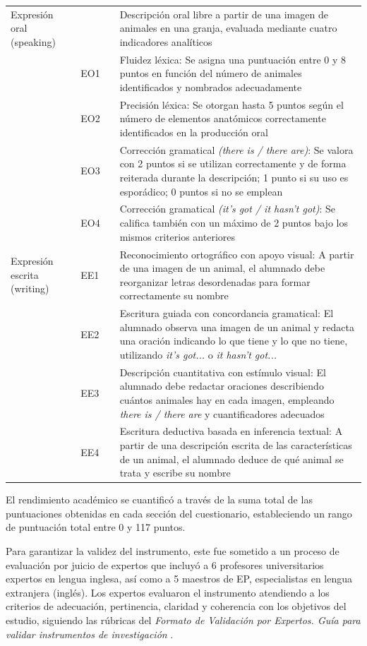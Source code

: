 \documentclass[spanish]{textolivre}
\begin{document}
\begin{longtable}{>{\raggedright\arraybackslash}p{1.9cm} >{\raggedright\arraybackslash}p{1.2cm} >{\raggedright\arraybackslash}p{1cm} p{9cm}}
\addlinespace

Expresión oral (speaking) &  &  & Descripción oral libre a partir de una imagen de animales en una granja, evaluada mediante cuatro indicadores analíticos \\
& EO1 & 8 & Fluidez léxica: Se asigna una puntuación entre 0 y 8 puntos en función del número de animales identificados y nombrados adecuadamente \\
& EO2 & 5 & Precisión léxica: Se otorgan hasta 5 puntos según el número de elementos anatómicos correctamente identificados en la producción oral \\
& EO3 & 2 & Corrección gramatical \textit{(there is / there are)}: Se valora con 2 puntos si se utilizan correctamente y de forma reiterada durante la descripción; 1 punto si su uso es esporádico; 0 puntos si no se emplean \\
& EO4 & 2 & Corrección gramatical \textit{(it’s got / it hasn’t got)}: Se califica también con un máximo de 2 puntos bajo los mismos criterios anteriores \\

\addlinespace

Expresión escrita (writing) & EE1 & 12 & Reconocimiento ortográfico con apoyo visual: A partir de una imagen de un animal, el alumnado debe reorganizar letras desordenadas para formar correctamente su nombre \\
& EE2 & 15 & Escritura guiada con concordancia gramatical: El alumnado observa una imagen de un animal y redacta una oración indicando lo que tiene y lo que no tiene, utilizando \textit{it’s got...} o \textit{it hasn’t got...} \\
& EE3 & 24 & Descripción cuantitativa con estímulo visual: El alumnado debe redactar oraciones describiendo cuántos animales hay en cada imagen, empleando \textit{there is / there are} y cuantificadores adecuados \\
& EE4 & 7 & Escritura deductiva basada en inferencia textual: A partir de una descripción escrita de las características de un animal, el alumnado deduce de qué animal se trata y escribe su nombre \\

\end{longtable}

El rendimiento académico se cuantificó a través de la suma total de las puntuaciones obtenidas en cada sección del cuestionario, estableciendo un rango de puntuación total entre 0 y 117 puntos.

Para garantizar la validez del instrumento, este fue sometido a un proceso de evaluación por juicio de expertos que incluyó a 6 profesores universitarios expertos en lengua inglesa, así como a 5 maestros de EP, especialistas en lengua extranjera (inglés). Los expertos evaluaron el instrumento atendiendo a los criterios de adecuación, pertinencia, claridad y coherencia con los objetivos del estudio, siguiendo las rúbricas del \textit{Formato de Validación por Expertos. Guía para validar instrumentos de investigación} \cite{direccion2018}.
\end{document}
